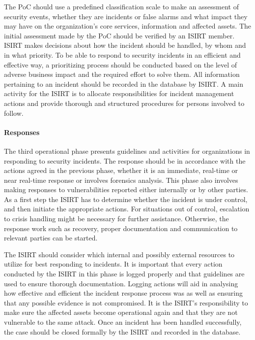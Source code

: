 The PoC should use a predefined classification scale to make an assessment of security events, whether they are incidents or false alarms and what impact they may have on the organization's core services, information and affected assets. The initial assessment made by the PoC should be verified by an \ac{ISIRT} member. \ac{ISIRT} makes decisions about how the incident should be handled, by whom and in what priority. To be able to respond to security incidents in an efficient and effective way, a prioritizing process should be conducted based on the level of adverse business impact and the required effort to solve them.  All information pertaining to an incident should be recorded in the database by \ac{ISIRT}. A main activity for the \ac{ISIRT} is to allocate responsibilities for incident management actions and provide thorough and structured procedures for persons involved to follow. 

\paragraph{Responses} The third operational phase presents guidelines and activities for organizations in responding to security incidents. The response should be in accordance with the actions agreed in the previous phase, whether it is an immediate, real-time or near real-time response or involves forensics analysis. This phase also involves making responses to vulnerabilities reported either internally or by other parties. As a first step the \ac{ISIRT} has to determine whether the incident is under control, and then initiate the appropriate actions. For situations out of control, escalation to crisis handling might be necessary for further assistance. Otherwise, the response work such as recovery, proper documentation and communication to relevant parties can be started. 

The \ac{ISIRT} should consider which internal and possibly external resources to utilize for best responding to incidents. It is important that every action conducted by the \ac{ISIRT} in this phase is logged properly and that guidelines are used to ensure thorough documentation. Logging actions will aid in analysing how effective and efficient the incident response process was as well as ensuring that any possible evidence is not compromised. It is the \ac{ISIRT}'s responsibility to make sure the affected assets become operational again and that they are not vulnerable to the same attack. Once an incident has been handled successfully, the case should be closed formally by the \ac{ISIRT} and recorded in the database.

